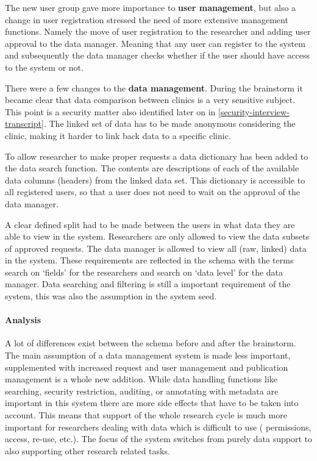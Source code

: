 The new user group gave more importance to \textbf{user management}, but also a change in user registration stressed the need of more extensive management functions.
Namely the move of user registration to the researcher and adding user approval to the data manager.
Meaning that any user can register to the system and subsequently the data manager checks whether if the user should have access to the system or not.

There were a few changes to the \textbf{data management}.
During the brainstorm it became clear that data comparison between clinics is a very sensitive subject.
This point is a security matter also identified later on in \ref{security-interview-transcript}.
The linked set of data has to be made anonymous considering the clinic, making it harder to link back data to a specific clinic.

To allow researcher to make proper requests a data dictionary has been added to the data search function.
The contents are descriptions of each of the available data columns (headers) from the linked data set.
This dictionary is accessible to all registered users, so that a user does not need to wait on the approval of the data manager.

A clear defined split had to be made between the users in what data they are able to view in the system.
Researchers are only allowed to view the data subsets of approved requests.
The data manager is allowed to view all (raw, linked) data in the system.
These requirements are reflected in the schema with the terms search on `fields' for the researchers and search on `data level' for the data manager.
Data searching and filtering is still a important requirement of the system, this was also the assumption in the system seed.

\paragraph{Analysis}
A lot of differences exist between the schema before and after the brainstorm.
The main assumption of a data management system is made less important, supplemented with increased request and user management and publication management is a whole new addition.
While data handling functions like searching, security restriction, auditing, or annotating with metadata are important in this system there are more side effects that have to be taken into account.
This means that support of the whole research cycle is much more important for researchers dealing with data which is difficult to use (\ie{} permissions, access, re-use, etc.).
The focus of the system switches from purely data support to also supporting other research related tasks.

